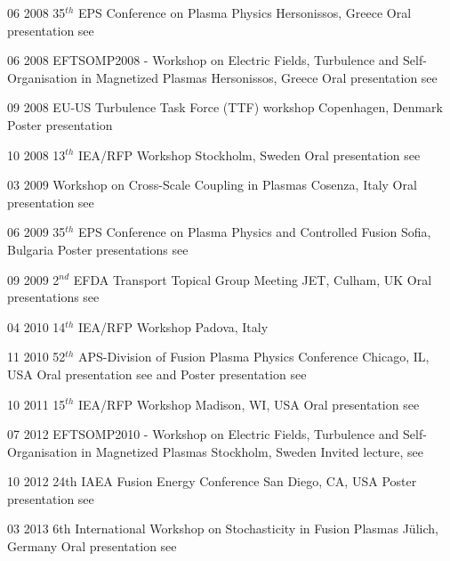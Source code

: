 {\begin{entrylist}
\entry
{06 2008}
{35$^{th}$ EPS Conference on Plasma Physics} 
{Hersonissos, Greece} 
{Oral presentation see \cite{vianello:eps2008}}

\entry
{06 2008} 
{EFTSOMP2008 - Workshop on Electric Fields, Turbulence and Self-Organisation in Magnetized Plasmas} 
{Hersonissos, Greece} 
{Oral presentation see \cite{vianello:eftsomp08}}

\entry
{09 2008} 
{EU-US Turbulence Task Force (TTF) workshop}
{Copenhagen, Denmark} 
{Poster presentation}

\entry
{10 2008} 
{13$^{th}$ IEA/RFP Workshop} 
{Stockholm, Sweden} 
{Oral presentation see \cite{vianello:rfp08}}

\entry
{03 2009} 
{Workshop on Cross-Scale Coupling in Plasmas}
{Cosenza, Italy }
{Oral presentation see \cite{vianello:cross}}

\entry
{06 2009} 
{35$^{th}$ EPS Conference on Plasma Physics and
 Controlled Fusion} 
{Sofia, Bulgaria} 
{Poster presentations see \cite{vianello:eps2009-rfx,
    vianello:eps2009-asdex}}

\entry
{09 2009} 
{2$^{nd}$ EFDA Transport Topical Group Meeting} 
{JET, Culham, UK} 
{Oral presentations see \cite{vianello:efda09, vianello:efda09b}}

\entry
{04 2010}
{14$^{th}$ IEA/RFP Workshop} 
{Padova, Italy}
{}

\entry
{11 2010} 
{52$^{th}$ APS-Division of Fusion Plasma Physics Conference}
{Chicago, IL, USA}
{Oral presentation see \cite{vianello:dpp2010} and Poster presentation
see \cite{vianello:dpp2010b}}

\entry
{10 2011} 
{15$^{th}$ IEA/RFP Workshop} 
{Madison, WI,  USA}
{Oral presentation see \cite{vianello:rfp2011}}

\entry
{07 2012}
{EFTSOMP2010 - Workshop on Electric Fields, Turbulence and
  Self-Organisation in Magnetized Plasmas}
{Stockholm, Sweden}
{Invited lecture,  see \cite{vianello:eftsomp2012}}

\entry
{10 2012} 
{24th IAEA Fusion Energy Conference} 
{San Diego, CA, USA}
{Poster presentation see \cite{Vianello:2012uh}}

\entry
{03 2013}
{6th International Workshop on Stochasticity in Fusion Plasmas} 
{J{\"u}lich, Germany}
{Oral presentation see \cite{vianello:sfp2013}}


\end{entrylist}}
